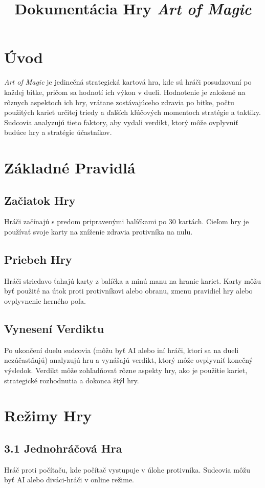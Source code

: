 \documentclass[12pt]{article}
\title{Dokumentácia Hry \textit{Art of Magic}}
\author{}
\date{}
\begin{document}
\maketitle

\section{Úvod}
\textit{Art of Magic}  je jedinečná strategická kartová hra, kde sú hráči posudzovaní po každej bitke, pričom sa hodnotí ich výkon v dueli. Hodnotenie je založené na rôznych aspektoch ich hry, vrátane zostávajúceho zdravia po bitke, počtu použitých kariet určitej triedy a ďalších kľúčových momentoch stratégie a taktiky. Sudcovia analyzujú tieto faktory, aby vydali verdikt, ktorý môže ovplyvniť budúce hry a stratégie účastníkov.

\section{Základné Pravidlá}
\subsection*{Začiatok Hry}
Hráči začínajú s predom pripravenými balíčkami po 30 kartách. Cieľom hry je používať svoje karty na zníženie zdravia protivníka na nulu.

\subsection{Priebeh Hry}
Hráči striedavo ťahajú karty z balíčka a minú manu na hranie kariet. Karty môžu byť použité na útok proti protivníkovi alebo obranu, zmenu pravidiel hry alebo ovplyvnenie herného poľa.

\subsection{Vynesení Verdiktu}
Po ukončení duelu sudcovia (môžu byť AI alebo iní hráči, ktorí sa na dueli nezúčastňujú) analyzujú hru a vynášajú verdikt, ktorý môže ovplyvniť konečný výsledok. Verdikt môže zohľadňovať rôzne aspekty hry, ako je použitie kariet, strategické rozhodnutia a dokonca štýl hry.

\section{Režimy Hry}
\subsection{3.1 Jednohráčová Hra}
Hráč proti počítaču, kde počítač vystupuje v úlohe protivníka. Sudcovia môžu byť AI alebo diváci-hráči v online režime.
\end{document}
